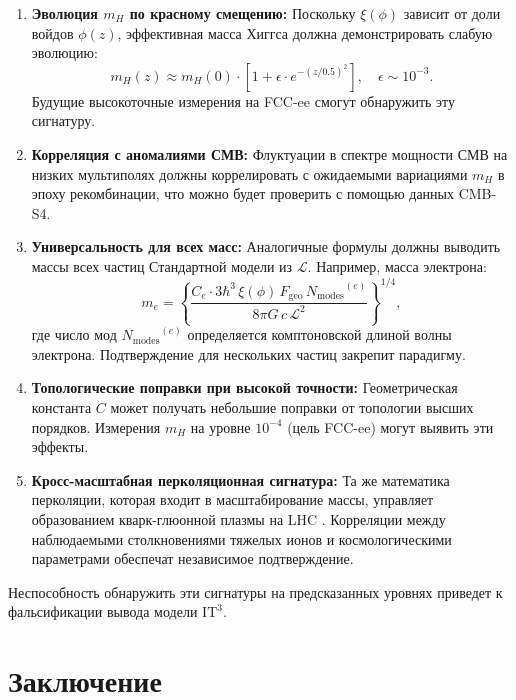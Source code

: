 \documentclass[11pt,a4paper]{article}
\newcommand{\ITthree}{\ensuremath{\mathrm{IT}^3}}
\newcommand{\Ltop}{\ensuremath{\mathcal{L}}}
\newcommand{\xiPhi}{\ensuremath{\xi(\phi)}}
\newcommand{\Fgeo}{\ensuremath{F_{\mathrm{geo}}}}
\newcommand{\Nmodes}{\ensuremath{N_{\mathrm{modes}}}}
\begin{document}
\begin{enumerate}
    \item \textbf{Эволюция $m_H$ по красному смещению:} Поскольку $\xiPhi$ зависит от доли войдов $\phi(z)$, эффективная масса Хиггса должна демонстрировать слабую эволюцию:
    \[
    m_H(z) \approx m_H(0) \cdot \left[1 + \epsilon \cdot e^{-(z/0.5)^2}\right], 
    \quad \epsilon \sim 10^{-3}.
    \]
    Будущие высокоточные измерения на FCC-ee смогут обнаружить эту сигнатуру.

    \item \textbf{Корреляция с аномалиями СМВ:} Флуктуации в спектре мощности СМВ на низких мультиполях должны коррелировать с ожидаемыми вариациями $m_H$ в эпоху рекомбинации, что можно будет проверить с помощью данных CMB-S4.

    \item \textbf{Универсальность для всех масс:} Аналогичные формулы должны выводить массы всех частиц Стандартной модели из $\Ltop$. Например, масса электрона:
    \[
    m_e = \left\{ \frac{C_e \cdot 3\hbar^3 \, \xiPhi \, \Fgeo \, \Nmodes^{(e)}}{8\pi G \, c \, \Ltop^2} \right\}^{1/4},
    \]
    где число мод $\Nmodes^{(e)}$ определяется комптоновской длиной волны электрона. Подтверждение для нескольких частиц закрепит парадигму.

    \item \textbf{Топологические поправки при высокой точности:} Геометрическая константа $C$ может получать небольшие поправки от топологии высших порядков. Измерения $m_H$ на уровне $10^{-4}$ (цель FCC-ee) могут выявить эти эффекты.

    \item \textbf{Кросс-масштабная перколяционная сигнатура:} Та же математика перколяции, которая входит в масштабирование массы, управляет образованием кварк-глюонной плазмы на LHC \citep{Logvinovich2026i}. Корреляции между наблюдаемыми столкновениями тяжелых ионов и космологическими параметрами обеспечат независимое подтверждение.
\end{enumerate}

Неспособность обнаружить эти сигнатуры на предсказанных уровнях приведет к фальсификации вывода модели $\ITthree$.

\section{Заключение}
\label{sec:conclusion}
\end{document}
